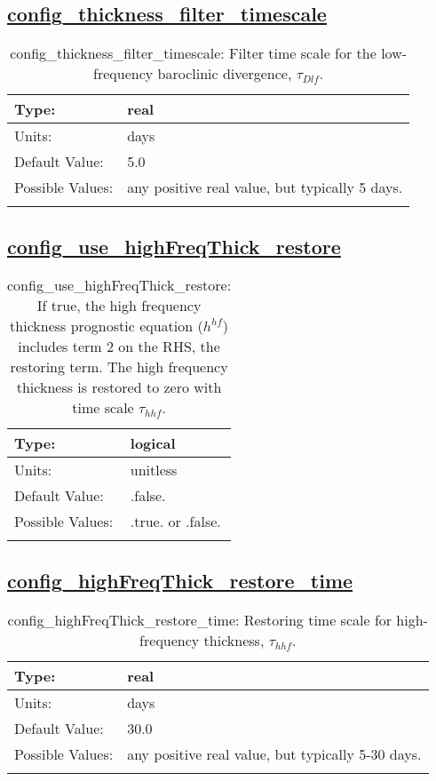\subsection[config\_thickness\_filter\_timescale]{\hyperref[sec:nm_tab_ALE_frequency_filtered_thickness]{config\_thickness\_filter\_timescale}}
\label{subsec:nm_sec_config_thickness_filter_timescale}
\begin{center}
\begin{longtable}{| p{2.0in} || p{4.0in} |}
    \hline
    Type: & real \\
    \hline
    Units: & \si{days} \\
    \hline
    Default Value: & 5.0 \\
    \hline
    Possible Values: & any positive real value, but typically 5 days. \\
    \hline
    \caption{config\_thickness\_filter\_timescale: Filter time scale for the low-frequency baroclinic divergence, $\tau_{Dlf}$.}
\end{longtable}
\end{center}
\subsection[config\_use\_highFreqThick\_restore]{\hyperref[sec:nm_tab_ALE_frequency_filtered_thickness]{config\_use\_highFreqThick\_restore}}
\label{subsec:nm_sec_config_use_highFreqThick_restore}
\begin{center}
\begin{longtable}{| p{2.0in} || p{4.0in} |}
    \hline
    Type: & logical \\
    \hline
    Units: & \si{unitless} \\
    \hline
    Default Value: & .false. \\
    \hline
    Possible Values: & .true. or .false. \\
    \hline
    \caption{config\_use\_highFreqThick\_restore: If true, the high frequency thickness prognostic equation ($h^{hf}$) includes term 2 on the RHS, the restoring term.  The high frequency thickness is restored to zero with time scale $\tau_{hhf}$.}
\end{longtable}
\end{center}
\subsection[config\_highFreqThick\_restore\_time]{\hyperref[sec:nm_tab_ALE_frequency_filtered_thickness]{config\_highFreqThick\_restore\_time}}
\label{subsec:nm_sec_config_highFreqThick_restore_time}
\begin{center}
\begin{longtable}{| p{2.0in} || p{4.0in} |}
    \hline
    Type: & real \\
    \hline
    Units: & \si{days} \\
    \hline
    Default Value: & 30.0 \\
    \hline
    Possible Values: & any positive real value, but typically 5-30 days. \\
    \hline
    \caption{config\_highFreqThick\_restore\_time: Restoring time scale for high-frequency thickness, $\tau_{hhf}$.}
\end{longtable}
\end{center}
